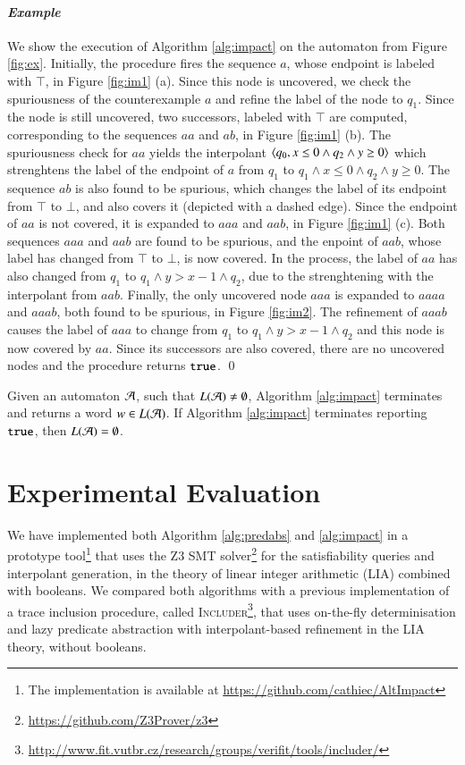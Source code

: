 \documentclass[10pt,conference,letterpaper,twocolumn]{IEEEtran}
\begin{document}
\paragraph{\em Example}
We show the execution of Algorithm \ref{alg:impact} on the automaton
from Figure \ref{fig:ex}.  Initially, the procedure fires the sequence
$a$, whose endpoint is labeled with $\top$, in Figure \ref{fig:im1}
(a). Since this node is uncovered, we check the spuriousness of the
counterexample $a$ and refine the label of the node to $q_1$. Since
the node is still uncovered, two successors, labeled with $\top$ are
computed, corresponding to the sequences $aa$ and $ab$, in Figure
\ref{fig:im1} (b). The spuriousness check for $aa$ yields the
interpolant $\left\langle q_0,x\leq0\wedge q_2 \wedge y\geq0 \right\rangle$ which
strenghtens the label of the endpoint of $a$ from $q_1$ to $q_1\wedge
x\leq0\wedge q_2\wedge y\geq0$. The sequence $ab$ is also found to be
spurious, which changes the label of its endpoint from $\top$ to
$\bot$, and also covers it (depicted with a dashed edge). Since the
endpoint of $aa$ is not covered, it is expanded to $aaa$ and $aab$, in
Figure \ref{fig:im1} (c). Both sequences $aaa$ and $aab$ are found to
be spurious, and the enpoint of $aab$, whose label has changed from
$\top$ to $\bot$, is now covered. In the process, the label of $aa$
has also changed from $q_1$ to $q_1 \wedge y>x-1 \wedge q_2$, due to
the strenghtening with the interpolant from $aab$.  Finally, the only
uncovered node $aaa$ is expanded to $aaaa$ and $aaab$, both found to be
spurious, in Figure \ref{fig:im2}. The refinement of $aaab$ causes
the label of $aaa$ to change from $q_1$ to $q_1 \wedge y>x-1 \wedge
q_2$ and this node is now covered by $aa$. Since its successors are
also covered, there are no uncovered nodes and the procedure returns
$\mathtt{true}$. \qed

\begin{theorem}\label{thm:impact}
  Given an automaton $\mathcal{A}$, such that $L(\mathcal{A}) \neq \emptyset$, Algorithm
  \ref{alg:impact} terminates and returns a word $w \in L(\mathcal{A})$. If
  Algorithm \ref{alg:impact} terminates reporting $\mathtt{true}$, then
  $L(\mathcal{A}) = \emptyset$.
\end{theorem}

\section{Experimental Evaluation}

We have implemented both Algorithm \ref{alg:predabs} and
\ref{alg:impact} in a prototype tool\footnote{The implementation is
  available at \url{https://github.com/cathiec/AltImpact}} that uses
the Z3 SMT solver\footnote{\url{https://github.com/Z3Prover/z3}} for
the satisfiability queries and interpolant generation, in the theory
of linear integer arithmetic (LIA) combined with booleans. We compared
both algorithms with a previous implementation of a trace inclusion
procedure, called
\textsc{Includer}\footnote{\url{http://www.fit.vutbr.cz/research/groups/verifit/tools/includer/}},
that uses on-the-fly determinisation and lazy predicate abstraction
with interpolant-based refinement \cite{Tacas16} in the LIA theory,
without booleans.
\end{document}
